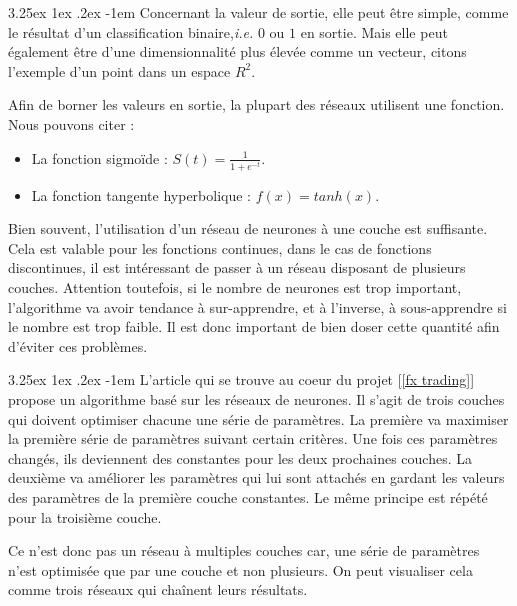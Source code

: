 \documentclass[a4paper, 11pt]{article}
\makeatletter
\renewcommand\paragraph{\@startsection{paragraph}{5}{\z@}%
  {3.25ex \@plus1ex \@minus.2ex}%
  {-1em}%
  {\normalfont\normalsize\bfseries}}
\makeatother
\begin{document}

\paragraph{}
Concernant la valeur de sortie, elle peut être simple, comme le résultat d'un classification binaire,\textit{i.e.} $0$ ou $1$ en sortie. Mais elle peut également être d'une dimensionnalité plus élevée comme un vecteur, citons l'exemple d'un point dans un espace $R^2$.

Afin de borner les valeurs en sortie, la plupart des réseaux utilisent une fonction. Nous pouvons citer :
\begin{itemize}
\item La fonction sigmoïde : $S(t) = \frac{1}{1 + e^{-t}}$.
\item La fonction tangente hyperbolique : $f(x) = tanh(x)$.
\end{itemize}

Bien souvent, l'utilisation d'un réseau de neurones à une couche est suffisante. Cela est valable pour les fonctions continues, dans le cas de fonctions discontinues, il est intéressant de passer à un réseau disposant de plusieurs couches. Attention toutefois, si le nombre de neurones est trop important, l'algorithme va avoir tendance à sur-apprendre, et à l'inverse, à sous-apprendre si le nombre est trop faible. Il est donc important de bien doser cette quantité afin d'éviter ces problèmes.

\paragraph{}
L'article qui se trouve au coeur du projet [\ref{fx trading}] propose un algorithme basé sur les réseaux de neurones. Il s'agit de trois couches qui doivent optimiser chacune une série de paramètres. La première va maximiser la première série de paramètres suivant certain critères. Une fois ces paramètres changés, ils deviennent des constantes pour les deux prochaines couches. La deuxième va améliorer les paramètres qui lui sont attachés en gardant les valeurs des paramètres de la première couche constantes. Le même principe est répété pour la troisième couche.

Ce n'est donc pas un réseau à multiples couches car, une série de paramètres n'est optimisée que par une couche et non plusieurs. On peut visualiser cela comme trois réseaux qui chaînent leurs résultats.
\end{document}
